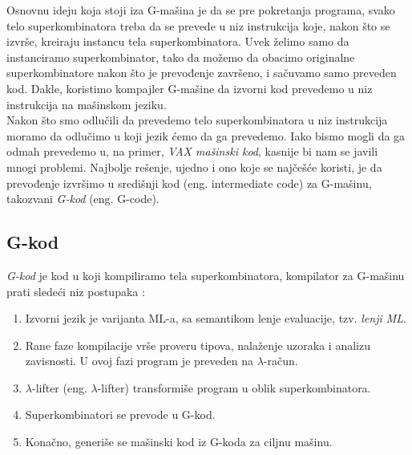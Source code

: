 Osnovnu ideju koja stoji iza G-mašina je da se pre pokretanja programa, svako telo superkombinatora treba da se prevede u niz instrukcija koje, nakon što se izvrše, kreiraju instancu tela superkombinatora. Uvek želimo samo da instanciramo superkombinator, tako da možemo da obacimo originalne superkombinatore nakon što je prevođenje završeno, i sačuvamo samo preveden kod. Dakle, koristimo kompajler G-mašine da izvorni kod prevedemo u niz instrukcija na mašinskom jeziku. \\

Nakon što smo odlučili da prevedemo telo superkombinatora u niz instrukcija moramo da odlučimo u koji jezik ćemo da ga prevedemo. Iako bismo mogli da ga odmah prevedemo u, na primer, {\em VAX mašinski kod}, kasnije bi nam se javili mnogi problemi.
Najbolje rešenje, ujedno i ono koje se najčešće koristi, je da prevođenje izvršimo u središnji kod (eng. intermediate code) za G-mašinu, takozvani {\em G-kod} (eng. G-code). \\

\subsection{G-kod}

{\em G-kod} je kod u koji kompiliramo tela superkombinatora, kompilator za G-mašinu prati sledeći niz postupaka \cite{the-implementation-of-functional-programming-languages, abstract-machines}:
\begin{enumerate}
\item Izvorni jezik je varijanta ML-a, sa semantikom lenje evaluacije, tzv. {\em lenji ML}.
\item Rane faze kompilacije vrše proveru tipova, nalaženje uzoraka i analizu zavisnosti. U ovoj fazi program je preveden na $\lambda$-račun.
\item $\lambda$-lifter (eng. $\lambda$-lifter) transformiše program u oblik superkombinatora.   
\item Superkombinatori se prevode u G-kod.
\item Konačno, generiše se mašinski kod iz G-koda za ciljnu mašinu.
\end{enumerate}

